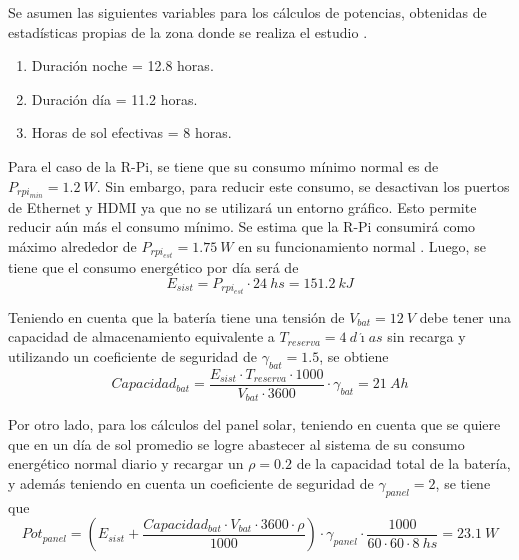 
Se asumen las siguientes variables para los cálculos de potencias, obtenidas de estadísticas propias de la zona donde se realiza el estudio \cite{ref:weather_bariloche}.
\begin{enumerate}
	\item Duración noche = 12.8 horas.
	\item Duración día = 11.2 horas.
	\item Horas de sol efectivas = 8 horas.
\end{enumerate}

Para el caso de la R-Pi, se tiene que su consumo mínimo normal es de $P_{rpi_{min}} = 1.2 \ W$. Sin embargo, para reducir este consumo, se desactivan los puertos de Ethernet y HDMI ya que no se utilizará un entorno gráfico. Esto permite reducir aún más el consumo mínimo. Se estima que la R-Pi consumirá como máximo alrededor de $P_{rpi_{est}} = 1.75 \ W$ en su funcionamiento normal \cite{ref:pot_rpi}. Luego, se tiene que el consumo energético por día será de
\begin{equation}
	E_{sist} = P_{rpi_{est}}\cdot 24 \ hs = 151.2 \ kJ
\end{equation}

Teniendo en cuenta que la batería tiene una tensión de $V_{bat} = 12 \ V$ debe tener una capacidad de almacenamiento equivalente a $T_{reserva} = 4 \ d\acute{\imath}as$ sin recarga \cite{ref:weather_bariloche} y utilizando un coeficiente de seguridad de $\gamma_{bat} = 1.5$, se obtiene
\begin{equation}
	Capacidad_{bat} = \frac{E_{sist}\cdot T_{reserva}\cdot 1000}{V_{bat}\cdot 3600}\cdot \gamma_{bat} = 21 \ Ah
\end{equation}

Por otro lado, para los cálculos del panel solar, teniendo en cuenta que se quiere que en un día de sol promedio se logre abastecer al sistema de su consumo energético normal diario y recargar un $\rho = 0.2$ de la capacidad total de la batería, y además teniendo en cuenta un coeficiente de seguridad de $\gamma_{panel} = 2$, se tiene que
\begin{equation}
	Pot_{panel} = \left( E_{sist} + \frac{Capacidad_{bat}\cdot V_{bat}\cdot 3600\cdot \rho}{1000}\right)\cdot \gamma_{panel} \cdot  \frac{1000}{60\cdot 60\cdot 8 \ hs} = 23.1 \ W
\end{equation}


